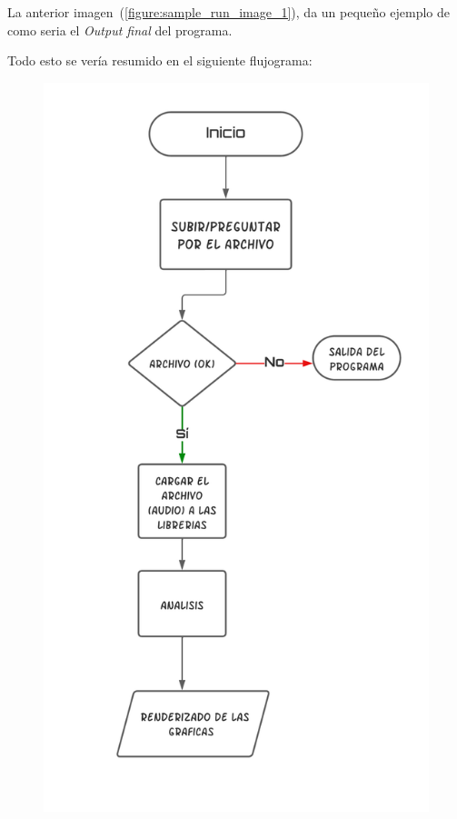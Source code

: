 \documentclass[letterpaper, 12pt]{article}
\begin{document}
\begin{enumerate}
	      La anterior imagen~(\ref{figure:sample_run_image_1}), da un
	      pequeño ejemplo de como seria el \textit{Output final} del
	      programa.
\end{enumerate}

Todo esto se vería resumido en el siguiente flujograma:

\begin{figure}[H]
	\begin{center}
		\includegraphics[width=.6\linewidth]{./Images/Flujograma.png}
		\caption{}
	\end{center}
\end{figure}

\nocite{source_code}

\printbibliography
\end{document}
